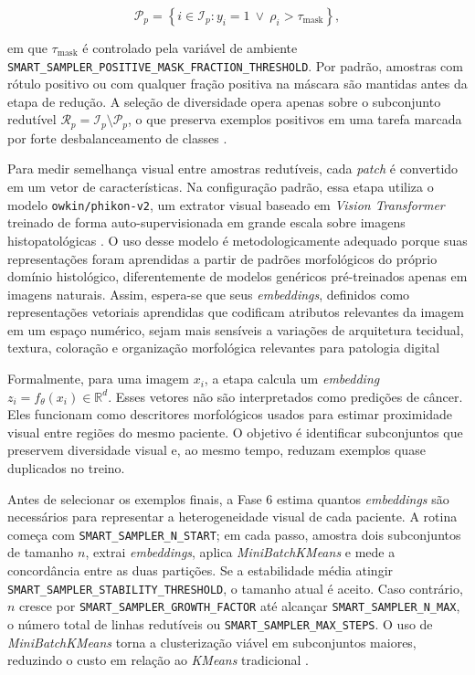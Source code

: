 \begin{equation}
    \mathcal{P}_p =
    \left\{
        i \in \mathcal{I}_p :
        y_i = 1
        \ \lor\
        \rho_i > \tau_{\mathrm{mask}}
    \right\},
    \label{eq:stage6_protected_set}
\end{equation}

em que $\tau_{\mathrm{mask}}$ é controlado pela variável de ambiente
\texttt{SMART\_SAMPLER\_POSITIVE\_MASK\_FRACTION\_THRESHOLD}. Por padrão,
amostras com rótulo positivo ou com qualquer fração positiva na máscara são
mantidas antes da etapa de redução. A seleção de diversidade opera apenas sobre
o subconjunto redutível
$\mathcal{R}_p=\mathcal{I}_p\setminus\mathcal{P}_p$, o que preserva exemplos
positivos em uma tarefa marcada por forte desbalanceamento de classes
\cite{he2009imbalanced}.

Para medir semelhança visual entre amostras redutíveis, cada \textit{patch} é
convertido em um vetor de características. Na configuração padrão, essa etapa
utiliza o modelo \texttt{owkin/phikon-v2}, um extrator visual baseado em
\textit{Vision Transformer} treinado de forma auto-supervisionada em grande
escala sobre imagens histopatológicas \cite{filiot2024phikonv2}. O uso desse
modelo é metodologicamente adequado porque suas representações foram aprendidas
a partir de padrões morfológicos do próprio domínio histológico, diferentemente
de modelos genéricos pré-treinados apenas em imagens naturais. Assim, espera-se que seus \textit{embeddings}, definidos como representações vetoriais aprendidas que codificam atributos relevantes da imagem em um espaço numérico, sejam mais sensíveis a variações de arquitetura tecidual, textura, coloração e organização morfológica relevantes para patologia digital

Formalmente, para uma imagem $x_i$, a etapa calcula um \textit{embedding}
$z_i=f_\theta(x_i)\in\mathbb{R}^d$. Esses vetores não são interpretados como
predições de câncer. Eles funcionam como descritores morfológicos usados para
estimar proximidade visual entre regiões do mesmo paciente. O objetivo é
identificar subconjuntos que preservem diversidade visual e, ao mesmo tempo,
reduzam exemplos quase duplicados no treino.

Antes de selecionar os exemplos finais, a Fase 6 estima quantos \textit{embeddings} são
necessários para representar a heterogeneidade visual de cada paciente. A rotina
começa com \texttt{SMART\_SAMPLER\_N\_START}; em cada passo, amostra dois
subconjuntos de tamanho $n$, extrai \textit{embeddings}, aplica \textit{MiniBatchKMeans} e mede a
concordância entre as duas partições. Se a estabilidade média atingir
\texttt{SMART\_SAMPLER\_STABILITY\_THRESHOLD}, o tamanho atual é aceito. Caso
contrário, $n$ cresce por \texttt{SMART\_SAMPLER\_GROWTH\_FACTOR} até alcançar
\texttt{SMART\_SAMPLER\_N\_MAX}, o número total de linhas redutíveis ou
\texttt{SMART\_SAMPLER\_MAX\_STEPS}. O uso de \textit{MiniBatchKMeans} torna a
clusterização viável em subconjuntos maiores, reduzindo o custo em relação ao
\textit{KMeans} tradicional \cite{sculley2010webscale}.


